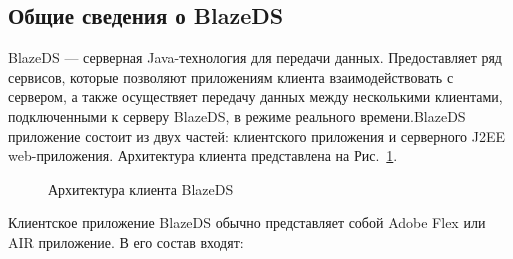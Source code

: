 \subsection{Общие сведения о BlazeDS}
BlazeDS --- серверная Java-технология для передачи данных. Предоставляет ряд сервисов, которые позволяют приложениям
клиента взаимодействовать с сервером, а также осуществяет передачу данных между несколькими клиентами, подключенными 
к серверу BlazeDS, в режиме реального времени.BlazeDS приложение состоит из двух частей: клиентского приложения и серверного 
J2EE web-приложения. Архитектура клиента представлена на Рис.~\ref{ris:blazeDSClient.png}.

\begin{figure}[ht]
\caption{Архитектура клиента BlazeDS}
\label{ris:blazeDSClient.png}
\end{figure}

Клиентское приложение BlazeDS обычно представляет собой Adobe Flex или AIR приложение. В его состав входят: 

